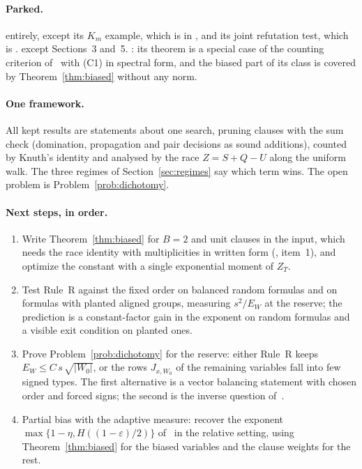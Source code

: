 \documentclass[11pt,a4paper]{article}
\theoremstyle{definition}
\theoremstyle{remark}
\begin{document}
\paragraph{Parked.} \cite{N6} entirely, except its $K_m$ example, which is in
\cite{N4}, and its joint refutation test, which is \cite[Proposition~7]{N4}.
\cite{N5} except Sections~3 and~5. \cite{N9}: its theorem is a special case of
the counting criterion of~\cite{CC,CA} with (C1) in spectral form, and the
biased part of its class is covered by Theorem~\ref{thm:biased} without any
norm.

\paragraph{One framework.} All kept results are statements about one search,
pruning clauses with the sum check (domination, propagation and pair decisions
as sound additions), counted by Knuth's identity and analysed by the race
$Z=S+Q-U$ along the uniform walk. The three regimes of Section~\ref{sec:regimes}
say which term wins. The open problem is Problem~\ref{prob:dichotomy}.

\paragraph{Next steps, in order.}
\begin{enumerate}
 \item Write Theorem~\ref{thm:biased} for $B=2$ and unit clauses in the
 input, which needs the race identity with multiplicities in written form
 (\cite[Section~4]{N9}, item~1), and optimize the constant with a single
 exponential moment of $Z_T$.
 \item Test Rule~R against the fixed order on balanced random formulas and on
 formulas with planted aligned groups, measuring $s^2/E_W$ at the reserve;
 the prediction is a constant-factor gain in the exponent on random formulas
 and a visible exit condition on planted ones.
 \item Prove Problem~\ref{prob:dichotomy} for the reserve: either Rule~R keeps
 $E_W\le C\,s\,\sqrt{|W_0|}$, or the rows $J_{x,W_0}$ of the remaining
 variables fall into few signed types. The first alternative is a vector
 balancing statement with chosen order and forced signs; the second is the
 inverse question of~\cite{NT}.
 \item Partial bias with the adaptive measure: recover the exponent
 $\max\{1-\eta,H((1-\varepsilon)/2)\}$ of~\cite[Theorem~11]{N3} in the relative
 setting, using Theorem~\ref{thm:biased} for the biased variables and the
 clause weights for the rest.
\end{enumerate}
\end{document}
